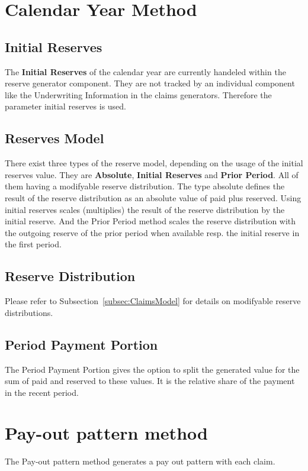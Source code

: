 \section{Calendar Year Method}
\label{sec:cal-year-method}
\subsection{Initial Reserves}
The \textbf{Initial Reserves} of the calendar year are currently handeled within the reserve generator component. They are not tracked by an individual component like the Underwriting Information in the claims generators. Therefore the parameter initial reserves is used. 

\subsection{Reserves Model}
There exist three types of the reserve model, depending on the usage of the initial reserves value. They are \textbf{Absolute}, \textbf{Initial Reserves} and \textbf{Prior Period}. All of them having a modifyable reserve distribution. The type absolute defines the result of the reserve distribution as an absolute value of paid plus reserved. Using initial reserves scales (multiplies) the result of the reserve distribution by the initial reserve. And the Prior Period method scales the reserve distribution with the outgoing reserve of the prior period when available resp. the initial reserve in the first period.

\subsection{Reserve Distribution}
Please refer to Subsection~\ref{subsec:ClaimsModel} for details on modifyable reserve distributions.

\subsection{Period Payment Portion}
The Period Payment Portion gives the option to split the generated value for the sum of paid and reserved to these values. It is the relative share of the payment in the recent period.

\section{Pay-out pattern method}
\label{sec:payout-pattern}

The Pay-out pattern method generates a pay out pattern with each claim. 